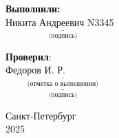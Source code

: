 \vfill
 \begin{flushright}
    \hfill \textbf{Выполнили:}\\
     \vspace{10pt}
      Никита Андреевич N3345 \\
     \vspace{10pt}
     $\underset{\text{(подпись)}}{\underline{\hspace{5cm}}}$\\
    \vspace{20pt}

    \textbf{Проверил}: \\
    \vspace{10pt}
    \hfill Федоров И. Р.\\
    \vspace{20pt}
    $\underset{\text{(отметка о выполнении)}}{\underline{\hspace{5cm}}}$\\
    \vspace{30pt}
    $\underset{\text{(подпись)}}{\underline{\hspace{5cm}}}$
 \end{flushright}
\vfill

\begin{center}
    Санкт-Петербург \\
    2025
\end{center}
